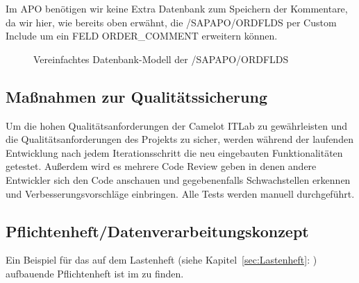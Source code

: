 Im APO benötigen wir keine Extra Datenbank zum Speichern der Kommentare, da wir hier, wie bereits oben erwähnt, die /SAPAPO/ORDFLDS per Custom Include um ein FELD ORDER\_COMMENT erweitern können.  

\begin{figure}[htb]
	\centering
	\caption{Vereinfachtes Datenbank-Modell der /SAPAPO/ORDFLDS}
	\label{fig:APO01}
\end{figure} 

\subsection{Maßnahmen zur Qualitätssicherung}
\label{sec:Qualitaetssicherung}
Um die hohen Qualitätsanforderungen der Camelot ITLab zu gewährleisten und die Qualitätsanforderungen des Projekts zu sicher, werden während der laufenden Entwicklung nach jedem Iterationsschritt die neu eingebauten Funktionalitäten getestet. Außerdem wird es mehrere Code Review geben in denen andere Entwickler sich den Code anschauen und gegebenenfalls Schwachstellen erkennen und Verbesserungsvorschläge einbringen. Alle Tests werden manuell durchgeführt.  

\subsection{Pflichtenheft/Datenverarbeitungskonzept}
\label{sec:Pflichtenheft}
Ein Beispiel für das auf dem Lastenheft (siehe Kapitel~\ref{sec:Lastenheft}: ) aufbauende Pflichtenheft ist im  zu finden.

